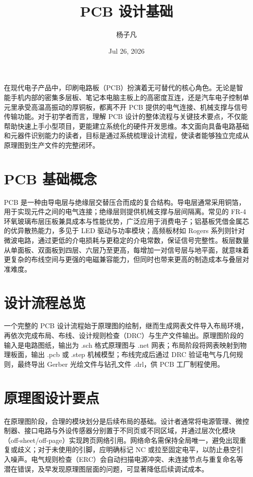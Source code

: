 \title{PCB 设计基础}
\author{杨子凡}
\date{Jul 26, 2026}
\maketitle
在现代电子产品中，印刷电路板（PCB）扮演着无可替代的核心角色。无论是智能手机内部的密集多层板、笔记本电脑主板上的高密度互连，还是汽车电子控制单元里承受高温高振动的厚铜板，都离不开 PCB 提供的电气连接、机械支撑与信号传输功能。对于初学者而言，理解 PCB 设计的整体流程与关键技术要点，不仅能帮助快速上手小型项目，更能建立系统化的硬件开发思维。本文面向具备电路基础和元器件识别能力的读者，目标是通过系统梳理设计流程，使读者能够独立完成从原理图到生产文件的完整闭环。\par
\chapter{PCB 基础概念}
PCB 是一种由导电层与绝缘层交替压合而成的复合结构。导电层通常采用铜箔，用于实现元件之间的电气连接；绝缘层则提供机械支撑与层间隔离。常见的 FR-4 环氧玻璃布层压板兼具成本与性能优势，广泛应用于消费电子；铝基板凭借金属芯的优异散热能力，多见于 LED 驱动与功率模块；高频板材如 Rogers 系列则针对微波电路，通过更低的介电损耗与更稳定的介电常数，保证信号完整性。板层数量从单面板、双面板到四层、六层乃至更高，每增加一对信号层与地平面，就意味着更复杂的布线空间与更强的电磁兼容能力，但同时也带来更高的制造成本与叠层对准难度。\par
\chapter{设计流程总览}
一个完整的 PCB 设计流程始于原理图的绘制，继而生成网表文件导入布局环境，再依次完成布局、布线、设计规则检查（DRC）与生产文件输出。原理图阶段的输入是电路图纸，输出为 .sch 格式原理图与 .net 网表；布局阶段将网表映射到物理板面，输出 .pcb 或 .step 机械模型；布线完成后通过 DRC 验证电气与几何规则，最终导出 Gerber 光绘文件与钻孔文件 .drl，供 PCB 工厂制程使用。\par
\chapter{原理图设计要点}
在原理图阶段，合理的模块划分是后续布局的基础。设计者通常将电源管理、微控制器、接口电路与外设传感器分别置于不同页或不同区域，并通过层次化模块（off-sheet/off-page）实现跨页网络引用。网络命名需保持全局唯一，避免出现重复或歧义；对于未使用的引脚，应明确标记 NC 或拉至固定电平，以防止悬空引入噪声。电气规则检查（ERC）会自动扫描电源冲突、未连接节点与重复命名等潜在错误，及早发现原理图层面的问题，可显著降低后续调试成本。\par
